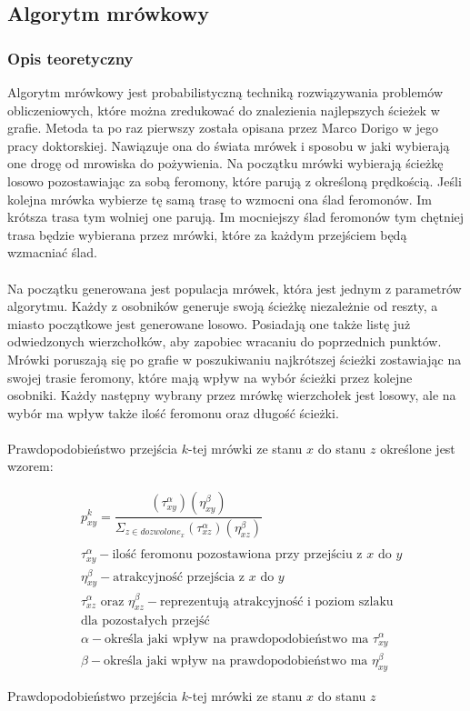 \documentclass[12pt,a4paper,titlepage]{article}
\begin{document}
\subsection{Algorytm mrówkowy}
\subsubsection{Opis teoretyczny}
Algorytm mrówkowy jest probabilistyczną techniką rozwiązywania problemów obliczeniowych, które można zredukować do znalezienia najlepszych ścieżek w grafie. Metoda ta po raz pierwszy została opisana przez Marco Dorigo w jego pracy doktorskiej. Nawiązuje ona do świata mrówek i sposobu w jaki wybierają one drogę od mrowiska do pożywienia. Na początku mrówki wybierają ścieżkę losowo pozostawiając za sobą feromony, które parują z określoną prędkością. Jeśli kolejna mrówka wybierze tę samą trasę to wzmocni ona ślad feromonów. Im krótsza trasa tym wolniej one parują. Im mocniejszy ślad feromonów tym chętniej trasa będzie wybierana przez mrówki, które za każdym przejściem będą wzmacniać ślad.
\\\\
Na początku generowana jest populacja mrówek, która jest jednym z parametrów algorytmu. Każdy z osobników generuje swoją ścieżkę niezależnie od reszty, a miasto początkowe jest generowane losowo. Posiadają one także listę już odwiedzonych wierzchołków, aby zapobiec wracaniu do poprzednich punktów. Mrówki poruszają się po grafie w poszukiwaniu najkrótszej ścieżki zostawiając na swojej trasie feromony, które mają wpływ na wybór ścieżki przez kolejne osobniki. Każdy następny wybrany przez mrówkę wierzchołek jest losowy, ale na wybór ma wpływ także ilość feromonu oraz długość ścieżki.
\\\\
Prawdopodobieństwo przejścia $k$-tej mrówki ze stanu $x$ do stanu $z$ określone jest wzorem:
\begin{myequation}[H]
\begin{equation}
    \begin{split}
    &p^{k}_{xy} = \dfrac{(\tau^{\alpha}_{xy})(\eta^{\beta}_{xy})}{\Sigma_{z\in dozwolone_{x}}(\tau^{\alpha}_{xz})(\eta^{\beta}_{xz})} \\\\
    &\tau^{\alpha}_{xy} - \text{ilość feromonu pozostawiona przy przejściu z $x$ do $y$} \\
    &\eta^{\beta}_{xy} - \text{atrakcyjność przejścia z $x$ do $y$} \\
    &\tau^{\alpha}_{xz} \text{ oraz } \eta^{\beta}_{xz} - \text{reprezentują atrakcyjność i poziom szlaku} \\
    &\text{dla pozostałych przejść} \\
    &\alpha - \text{określa jaki wpływ na prawdopodobieństwo ma }\tau^{\alpha}_{xy} \\
    &\beta - \text{określa jaki wpływ na prawdopodobieństwo ma }\eta^{\beta}_{xy}
    \end{split}
\end{equation}
\caption{Prawdopodobieństwo przejścia $k$-tej mrówki ze stanu $x$ do stanu $z$}
\end{myequation}
\end{document}
